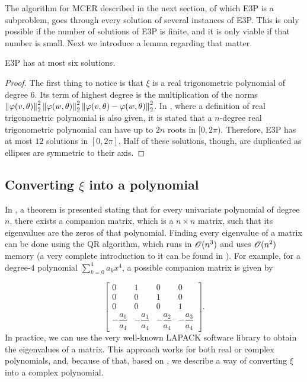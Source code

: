 The algorithm for MCER described in the next section, of which E3P is a subproblem, goes through every solution of several instances of E3P. This is only possible if the number of solutions of E3P is finite, and it is only viable if that number is small. Next we introduce a lemma regarding that matter.

\begin{lem}\label{lema:e3p}
	E3P has at most six solutions.
\end{lem}

\begin{proof}
	The first thing to notice is that $\xi$ is a real trigonometric polynomial of degree $6$. 
	Its term of highest degree is the multiplication of the norms $\left\lVert\varphi(v, \theta)\right\rVert_{2}^2\left\lVert\varphi(w, \theta)\right\rVert_{2}^2\left\lVert\varphi(v, \theta)-\varphi(w, \theta)\right\rVert_{2}^2$. In \cite[p.~150]{powell}, where a definition of real trigonometric polynomial is also given, it is stated that a $n$-degree real trigonometric polynomial can have up to $2n$ roots in $[0, 2\pi)$. Therefore, E3P has at most $12$ solutions in $[0, 2\pi]$.
	Half of these solutions, though, are duplicated as ellipses are symmetric to their axis.
\end{proof}

\subsection{Converting $\xi$ into a polynomial}

In \cite[p.~195]{horn}, a theorem is presented stating that for every univariate polynomial of degree $n$, there exists a companion matrix, which is a $n\times n$ matrix, such that its eigenvalues are the zeros of that polynomial. Finding every eigenvalue of a matrix can be done using the QR algorithm, which runs in $\mathscr{O}(n^3)$ and uses $\mathscr{O}(n^2)$ memory (a very complete introduction to it can be found in \cite{watkins:2008}). For example, for a degree-$4$ polynomial $\sum_{k=0}^4 a_k x^4$, a possible companion matrix is given by

 \begin{equation*}
\left[\begin{array}{ccccc}
0 & 1 & 0 & 0\\
0 & 0 & 1 & 0\\
0 & 0 & 0 & 1\\
-\dfrac{a_0}{a_4} & -\dfrac{a_1}{a_4} & -\dfrac{a_2}{a_4} & -\dfrac{a_3}{a_4}
\end{array}\right].
\end{equation*}
In practice, we can use the very well-known LAPACK software library to obtain the eigenvalues of a matrix\cite{lapack}.
This approach works for both real or complex polynomials, and, because of that, based on \cite{weidner}, we describe a way of converting $\xi$ into a complex polynomial.


